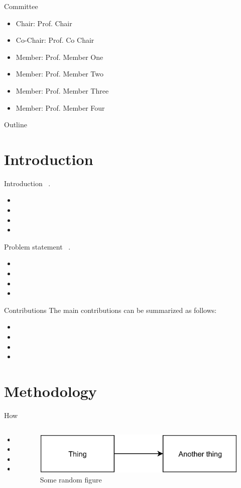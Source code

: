 \documentclass{tamupres/tamupres}
\newcommand{\fakepoints}[1]{
  \begin{itemize}
  \item \lipsum[#1][1]
  \item \lipsum[#1][2]
  \item \lipsum[#1][3]
  \item \lipsum[#1][4]
  \end{itemize}
}
\begin{document}
\tamutitlepage{}

\begin{frame}{Committee}
  \begin{itemize}
  \item Chair: Prof. Chair
  \item Co-Chair: Prof. Co Chair
  \item Member: Prof. Member One
  \item Member: Prof. Member Two
  \item Member: Prof. Member Three
  \item Member: Prof. Member Four
  \end{itemize}
\end{frame}

\begin{frame}{Outline}
  \tableofcontents
\end{frame}

\section{Introduction}
\begin{frame}{Introduction}
  \lipsum[10][1]~\cite{samplebib}.
  \fakepoints{1}
\end{frame}

\begin{frame}{Problem statement}
  \lipsum[10][2]~\cite{mybib1}.
  \fakepoints{2}
\end{frame}

\begin{frame}{Contributions}
  The main contributions can be summarized as follows:
  \fakepoints{3}
\end{frame}

\section{Methodology}
\begin{frame}{How}
  \begin{columns}
    \begin{column}{.4\columnwidth}
      \fakepoints{4}
    \end{column}
    \begin{column}{.6\columnwidth}
      \begin{figure}[htbp]
        \centering
        \includegraphics[width=\linewidth]{samplefig.png}
        \caption{Some random figure}
      \end{figure}
    \end{column}
  \end{columns}
\end{frame}
\end{document}
